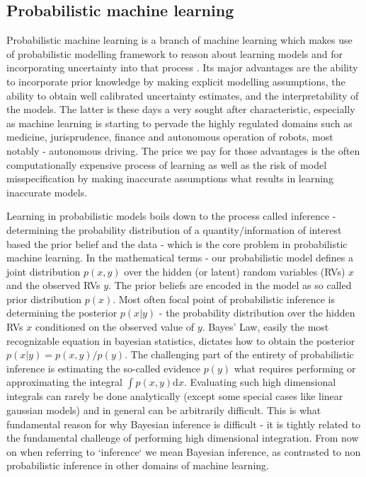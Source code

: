 \documentclass[12pt]{article}
\begin{document}
\subsection{Probabilistic machine learning}
Probabilistic machine learning is a branch of machine learning which makes use of probabilistic modelling framework to reason about learning models and for incorporating uncertainty into that process \citep{Ghahramani2015}.
Its major advantages are the ability to incorporate prior knowledge by making explicit modelling assumptions, the ability to obtain well calibrated uncertainty estimates, and the interpretability of the models.
The latter is these days a very sought after characteristic, especially as machine learning is starting to pervade the highly regulated domains such as medicine, jurisprudence, finance and autonomous operation of robots, most notably - autonomous driving.
The price we pay for those advantages is the often computationally expensive process of learning as well as the risk of model misspecification by making inaccurate assumptions what results in learning inaccurate models.

Learning in probabilistic models boils down to the process called inference - determining the probability distribution of a quantity/information of interest based the prior belief and the data - which is the core problem in probabilistic machine learning.
In the mathematical terms - our probabilistic model defines a joint distribution $p(x,y)$ over the hidden (or latent) random variables (RVs) $x$ and the observed RVs $y$.
The prior beliefs are encoded in the model as so called prior distribution $p(x)$.
Most often focal point of probabilistic inference is determining the posterior $p(x|y)$ - the probability distribution over the hidden RVs $x$ conditioned on the observed value of $y$.
Bayes' Law, easily the most recognizable equation in bayesian statistics, dictates how to obtain the posterior $p(x|y) = p(x,y)/p(y)$.
The challenging part of the entirety of probabilistic inference is estimating the so-called evidence $p(y)$ what requires performing or approximating the integral $\int p(x,y) \text{d}x$.
Evaluating such high dimensional integrals can rarely be done analytically (except some special cases like linear gaussian models) and in general can be arbitrarily difficult.
This is what fundamental reason for why Bayesian inference is difficult - it is tightly related to the fundamental challenge of performing high dimensional integration. 
From now on when referring to `inference` we mean Bayesian inference, as contrasted to non probabilistic inference in other domains of machine learning.
\end{document}
